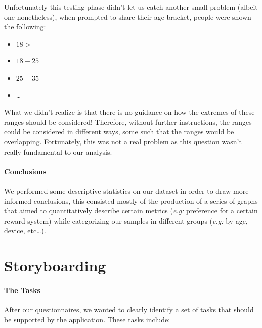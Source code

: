 \documentclass[a4paper, 11pt]{report}
\begin{document}
Unfortunately this testing phase didn't let us catch another small problem (albeit one nonetheless),
when prompted to share their age bracket, people were shown the following:
\begin{itemize}
	\item $18>$
	\item $18-25$
	\item $25-35$
	\item \dots
\end{itemize}

What we didn't realize is that there is no guidance on how the extremes of these ranges should be considered!
Therefore, without further instructions, the ranges could be considered in different ways, some such that
the ranges would be overlapping.
Fortunately, this was not a real problem as this question wasn't really fundamental to our analysis.

\paragraph{Conclusions}
We performed some descriptive statistics on our dataset in order to draw more informed conclusions,
this consisted mostly of the production of a series of graphs that aimed to quantitatively
describe certain metrics (\emph{e.g:} preference for a certain reward system) while categorizing
our samples in different groups (\emph{e.g:} by age, device, etc\dots).



%
%

\section{Storyboarding}\label{sec:storyboarding}

\paragraph{The Tasks}

After our questionnaires, we wanted to clearly identify a set of tasks that should be
supported by the application. These tasks include:
\end{document}

